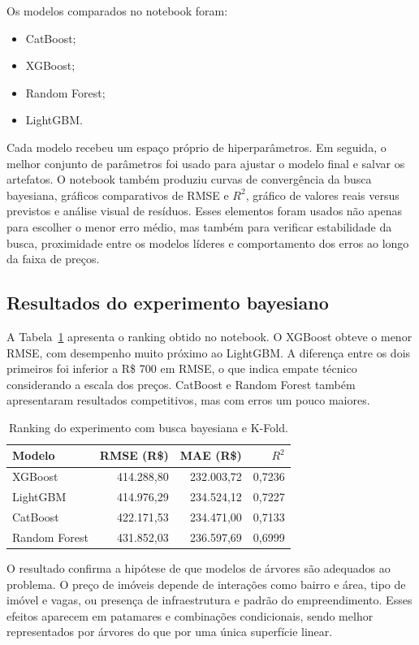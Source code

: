 \documentclass[12pt,a4paper]{article}
\begin{document}
Os modelos comparados no notebook foram:

\begin{itemize}
    \item CatBoost;
    \item XGBoost;
    \item Random Forest;
    \item LightGBM.
\end{itemize}

Cada modelo recebeu um espaço próprio de hiperparâmetros. Em seguida, o melhor conjunto de parâmetros foi usado para ajustar o modelo final e salvar os artefatos. O notebook também produziu curvas de convergência da busca bayesiana, gráficos comparativos de RMSE e $R^2$, gráfico de valores reais versus previstos e análise visual de resíduos. Esses elementos foram usados não apenas para escolher o menor erro médio, mas também para verificar estabilidade da busca, proximidade entre os modelos líderes e comportamento dos erros ao longo da faixa de preços.

\subsection{Resultados do experimento bayesiano}

A Tabela~\ref{tab:ranking-notebook} apresenta o ranking obtido no notebook. O XGBoost obteve o menor RMSE, com desempenho muito próximo ao LightGBM. A diferença entre os dois primeiros foi inferior a R\$ 700 em RMSE, o que indica empate técnico considerando a escala dos preços. CatBoost e Random Forest também apresentaram resultados competitivos, mas com erros um pouco maiores.

\begin{table}[H]
\centering
\caption{Ranking do experimento com busca bayesiana e K-Fold.}
\label{tab:ranking-notebook}
\begin{tabular}{lrrr}
\toprule
Modelo & RMSE (R\$) & MAE (R\$) & $R^2$ \\
\midrule
XGBoost & 414.288,80 & 232.003,72 & 0,7236 \\
LightGBM & 414.976,29 & 234.524,12 & 0,7227 \\
CatBoost & 422.171,53 & 234.471,00 & 0,7133 \\
Random Forest & 431.852,03 & 236.597,69 & 0,6999 \\
\bottomrule
\end{tabular}
\end{table}

O resultado confirma a hipótese de que modelos de árvores são adequados ao problema. O preço de imóveis depende de interações como bairro e área, tipo de imóvel e vagas, ou presença de infraestrutura e padrão do empreendimento. Esses efeitos aparecem em patamares e combinações condicionais, sendo melhor representados por árvores do que por uma única superfície linear.
\end{document}
